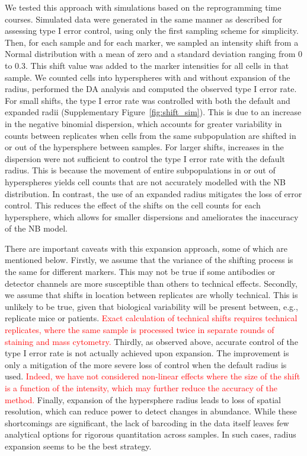 \documentclass{article}
\newcommand\revised[1]{\textcolor{red}{#1}}
\begin{document}
We tested this approach with simulations based on the reprogramming time courses.
Simulated data were generated in the same manner as described for assessing type I error control, using only the first sampling scheme for simplicity.
Then, for each sample and for each marker, we sampled an intensity shift from a Normal distribution with a mean of zero and a standard deviation ranging from 0 to 0.3.
This shift value was added to the marker intensities for all cells in that sample.
We counted cells into hyperspheres with and without expansion of the radius, performed the DA analysis and computed the observed type I error rate.
For small shifts, the type I error rate was controlled with both the default and expanded radii (Supplementary Figure~\ref{fig:shift_sim}).
This is due to an increase in the negative binomial dispersion, which accounts for greater variability in counts between replicates when cells from the same subpopulation are shifted in or out of the hypersphere between samples. 
For larger shifts, increases in the dispersion were not sufficient to control the type I error rate with the default radius.
This is because the movement of entire subpopulations in or out of hyperspheres yields cell counts that are not accurately modelled with the NB distribution.
In contrast, the use of an expanded radius mitigates the loss of error control.
This reduces the effect of the shifts on the cell counts for each hypersphere, which allows for smaller dispersions and ameliorates the inaccuracy of the NB model.

There are important caveats with this expansion approach, some of which are mentioned below.
Firstly, we assume that the variance of the shifting process is the same for different markers.
This may not be true if some antibodies or detector channels are more susceptible than others to technical effects.
Secondly, we assume that shifts in location between replicates are wholly technical.
This is unlikely to be true, given that biological variability will be present between, e.g., replicate mice or patients.
\revised{Exact calculation of technical shifts requires technical replicates, where the same sample is processed twice in separate rounds of staining and mass cytometry.}
Thirdly, as observed above, accurate control of the type I error rate is not actually achieved upon expansion.
The improvement is only a mitigation of the more severe loss of control when the default radius is used.
\revised{Indeed, we have not considered non-linear effects where the size of the shift is a function of the intensity, which may further reduce the accuracy of the method.}
Finally, expansion of the hypersphere radius leads to loss of spatial resolution, which can reduce power to detect changes in abundance.
While these shortcomings are significant, the lack of barcoding in the data itself leaves few analytical options for rigorous quantitation across samples.
In such cases, radius expansion seems to be the best strategy.
\end{document}

